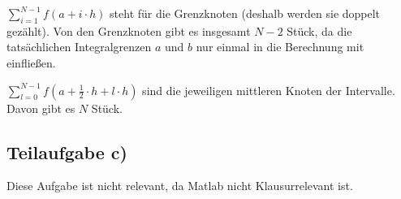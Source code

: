 $\sum_{i=1}^{N-1} f(a + i \cdot h)$ steht für die Grenzknoten
 (deshalb werden sie doppelt gezählt). Von den Grenzknoten gibt es
insgesamt $N-2$ Stück, da die tatsächlichen Integralgrenzen $a$ und $b$
nur einmal in die Berechnung mit einfließen.

$\sum_{l=0}^{N-1} f(a + \frac{1}{2} \cdot h + l \cdot h)$ sind die jeweiligen
mittleren Knoten der Intervalle. Davon gibt es $N$ Stück.

\subsection*{Teilaufgabe c)}
Diese Aufgabe ist nicht relevant, da Matlab nicht Klausurrelevant ist.
